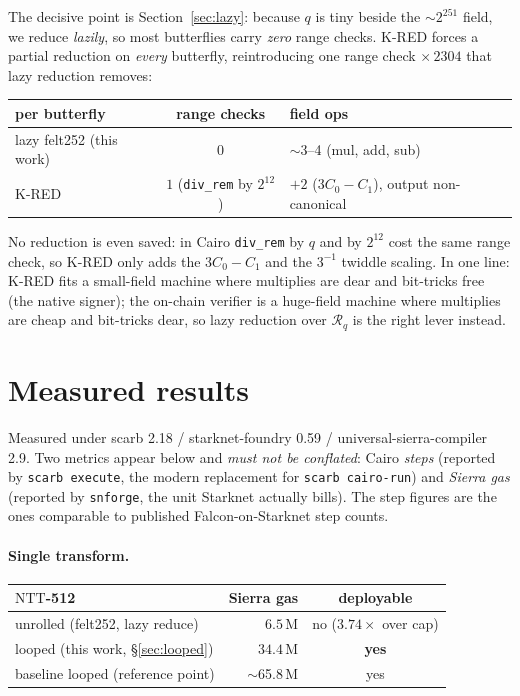 \documentclass[11pt]{article}
\newcommand{\Rq}{\mathcal{R}_q}
\newcommand{\NTT}{\mathrm{NTT}}
\begin{document}
The decisive point is Section~\ref{sec:lazy}: because $q$ is tiny beside the $\sim 2^{251}$
field, we reduce \emph{lazily}, so most butterflies carry \emph{zero} range checks. K-RED
forces a partial reduction on \emph{every} butterfly, reintroducing one range check
$\times\,2304$ that lazy reduction removes:
\begin{center}
\begin{tabular}{lcl}
\toprule
per butterfly & range checks & field ops \\
\midrule
lazy felt252 (this work) & $0$ & $\sim$3--4 (mul, add, sub) \\
K-RED & $1$ (\texttt{div\_rem} by $2^{12}$) & $+2$ ($3C_0-C_1$), output non-canonical \\
\bottomrule
\end{tabular}
\end{center}
No reduction is even saved: in Cairo \texttt{div\_rem} by $q$ and by $2^{12}$ cost the same
range check, so K-RED only adds the $3C_0-C_1$ and the $3^{-1}$ twiddle scaling. In one line:
K-RED fits a small-field machine where multiplies are dear and bit-tricks free (the native
signer); the on-chain verifier is a huge-field machine where multiplies are cheap and
bit-tricks dear, so lazy reduction over $\Rq$ is the right lever instead.

\section{Measured results}
Measured under scarb 2.18 / starknet-foundry 0.59 / universal-sierra-compiler 2.9. Two metrics
appear below and \emph{must not be conflated}: Cairo \emph{steps} (reported by \texttt{scarb
execute}, the modern replacement for \texttt{scarb cairo-run}) and \emph{Sierra gas} (reported by
\texttt{snforge}, the unit Starknet actually bills). The step figures are the ones comparable to
published Falcon-on-Starknet step counts.

\paragraph{Single transform.}
\begin{center}
\begin{tabular}{lrc}
\toprule
$\NTT$-512 & Sierra gas & deployable \\
\midrule
unrolled (felt252, lazy reduce) & $6.5$\,M & no ($3.74\times$ over cap) \\
looped (this work, \S\ref{sec:looped}) & $34.4$\,M & \textbf{yes} \\
baseline looped (reference point) & $\sim$65.8\,M & yes \\
\bottomrule
\end{tabular}
\end{center}
\end{document}
